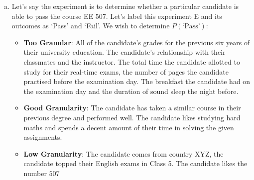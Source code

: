 \begin{enumerate}[a.]
	\item Let's say the experiment is to determine whether a particular candidate is able to pass the course EE 507. Let's label this experiment E and its outcomes as `Pass' and `Fail'. We wish to determine $P(\text{`Pass'})$:
		\begin{itemize}
			\item \textbf{Too Granular}: All of the candidate's grades for the previous six years of their university education. The candidate's relationship with their classmates and the instructor. The total time the candidate allotted to study for their real-time exams, the number of pages the candidate practised before the examination day. The breakfast the candidate had on the examination day and the duration of sound sleep the night before.
			\item \textbf{Good Granularity}: The candidate has taken a similar course in their previous degree and performed well. The candidate likes studying hard maths and spends a decent amount of their time in solving the given assignments.
			\item \textbf{Low Granularity}: The candidate comes from country XYZ, the candidate topped their English exams in Class 5. The candidate likes the number $507$
		\end{itemize}
\end{enumerate}